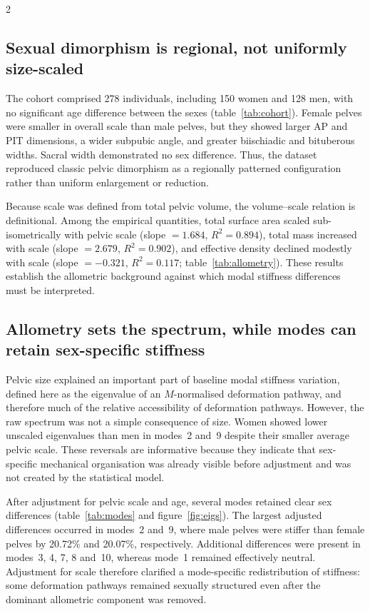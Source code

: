 \documentclass[openacc]{rsproca_new}
\begin{document}
\begin{multicols}{2}
\subsection{Sexual dimorphism is regional, not uniformly size-scaled}

The cohort comprised 278 individuals, including 150 women and 128 men, with no significant age difference between the sexes (table~\ref{tab:cohort}). Female pelves were smaller in overall scale than male pelves, but they showed larger AP and PIT dimensions, a wider subpubic angle, and greater biischiadic and bituberous widths. Sacral width demonstrated no sex difference. Thus, the dataset reproduced classic pelvic dimorphism as a regionally patterned configuration rather than uniform enlargement or reduction.

Because scale was defined from total pelvic volume, the volume--scale relation is definitional. Among the empirical quantities, total surface area scaled sub-isometrically with pelvic scale (slope $=1.684$, $R^2=0.894$), total mass increased with scale (slope $=2.679$, $R^2=0.902$), and effective density declined modestly with scale (slope $=-0.321$, $R^2=0.117$; table~\ref{tab:allometry}). These results establish the allometric background against which modal stiffness differences must be interpreted.

\subsection{Allometry sets the spectrum, while modes can retain sex-specific stiffness}

Pelvic size explained an important part of baseline modal stiffness variation, defined here as the eigenvalue of an $M$-normalised deformation pathway, and therefore much of the relative accessibility of deformation pathways. However, the raw spectrum was not a simple consequence of size. Women showed lower unscaled eigenvalues than men in modes~2 and~9 despite their smaller average pelvic scale. These reversals are informative because they indicate that sex-specific mechanical organisation was already visible before adjustment and was not created by the statistical model.

After adjustment for pelvic scale and age, several modes retained clear sex differences (table~\ref{tab:modes} and figure~\ref{fig:eigs}). The largest adjusted differences occurred in modes~2 and~9, where male pelves were stiffer than female pelves by 20.72\% and 20.07\%, respectively. Additional differences were present in modes~3, 4, 7, 8 and~10, whereas mode~1 remained effectively neutral. Adjustment for scale therefore clarified a mode-specific redistribution of stiffness: some deformation pathways remained sexually structured even after the dominant allometric component was removed.


\end{multicols}
\end{document}
